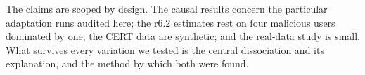\documentclass[10pt]{article}
\begin{document}
The claims are scoped by design. The causal results concern the
particular adaptation runs audited here; the r6.2 estimates rest on
four malicious users dominated by one; the CERT data are synthetic; and
the real-data study is small. What survives every variation we tested
is the central dissociation and its explanation, and the method by
which both were found.
\end{document}
